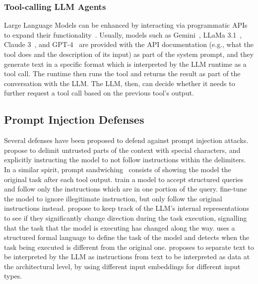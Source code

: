 \documentclass[11pt, a4paper, logo, copyright]{googledeepmind}
\begin{document}
\subsubsection{Tool-calling LLM Agents}\label{app:tc-agents}

Large Language Models can be enhanced by interacting via programmatic APIs to expand their functionality~\citep{schick2023toolformer}. Usually, models such as Gemini~\citep{geminiteam2024gemini}, LLaMa 3.1~\citep{dubey2024llama3}, Claude 3~\citep{claude}, and GPT-4~\citep{openai2024gpt4} are provided with the API documentation (e.g., what the tool does and the description of its input) as part of the system prompt, and they generate text in a specific format which is interpreted by the LLM runtime as a tool call. The runtime then runs the tool and returns the result as part of the conversation with the LLM. The LLM, then, can decide whether it needs to further request a tool call based on the previous tool's output.

\subsection{Prompt Injection Defenses}\label{app:pi-defenses}

Several defenses have been proposed to defend against prompt injection attacks. \citet{hines2024defending} propose to delimit untrusted parts of the context with special characters, and explicitly instructing the model to not follow instructions within the delimiters. In a similar spirit, prompt sandwiching~\citep{learnprompting2024sandwich} consists of showing the model the original task after each tool output. \citet{chen2024struq} train a model to accept structured queries and follow only the instructions which are in one portion of the query. \citet{wallace2024instruction,wu2024instructional} fine-tune the model to ignore illegitimate instruction, but only follow the original instructions instead. \citet{abdelnabi2024you} propose to keep track of the LLM's internal representations to see if they significantly change direction during the task execution, signalling that the task that the model is executing has changed along the way. \citet{sharma2024spml} uses a structured formal language to define the task of the model and detects when the task being executed is different from the original one. \citet{zverev2025aside} proposes to separate text to be interpreted by the LLM as instructions from text to be interpreted as data at the architectural level, by using different input embeddings for different input types.
\end{document}
